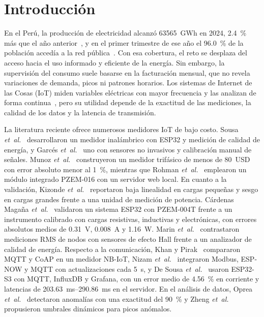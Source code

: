 \section{Introducción}
\label{sec:introduction}

En el Perú, la producción de electricidad alcanzó \SI{63565}{GWh} en 2024, \SI{2,4}{\percent} más que el año anterior~\cite{minem2025produccion}, y en el primer trimestre de ese año el \SI{96,0}{\percent} de la población accedía a la red pública~\cite{inei2024acceso}.
Con esa cobertura, el reto se desplaza del acceso hacia el uso informado y eficiente de la energía.
Sin embargo, la supervisión del consumo suele basarse en la facturación mensual, que no revela variaciones de demanda, picos ni patrones horarios.
Los sistemas de Internet de las Cosas (IoT) miden variables eléctricas con mayor frecuencia y las analizan de forma continua~\cite{rind2023perspective}, pero su utilidad depende de la exactitud de las mediciones, la calidad de los datos y la latencia de transmisión.

La literatura reciente ofrece numerosos medidores IoT de bajo costo.
Sousa \textit{et~al.}~\cite{sousa2023smartmeter} desarrollaron un medidor inalámbrico con ESP32 y medición de calidad de energía, y Garcés \textit{et~al.}~\cite{garces2025iotmeter} uno con sensores no invasivos y calibración manual de señales.
Munoz \textit{et~al.}~\cite{munoz2024smartmeter} construyeron un medidor trifásico de menos de \SI{80}{USD} con error absoluto menor al \SI{1}{\percent}, mientras que Rohman \textit{et~al.}~\cite{rohman2025esp32} emplearon un módulo integrado PZEM-016 con un servidor web local.
En cuanto a la validación, Kizonde \textit{et~al.}~\cite{kizonde2023monitoringnode} reportaron baja linealidad en cargas pequeñas y sesgo en cargas grandes frente a una unidad de medición de potencia.
Cárdenas Magaña \textit{et~al.}~\cite{cardenas2026residential} validaron un sistema ESP32 con PZEM-004T frente a un instrumento calibrado con cargas resistivas, inductivas y electrónicas, con errores absolutos medios de \SI{0,31}{V}, \SI{0,008}{A} y \SI{1,16}{W}.
Marin \textit{et~al.}~\cite{marin2026rmsbenchmark} contrastaron mediciones RMS de nodos con sensores de efecto Hall frente a un analizador de calidad de energía.
Respecto a la comunicación, Khan y Pirak~\cite{khan2021mqtt} compararon MQTT y CoAP en un medidor NB-IoT, Nizam \textit{et~al.}~\cite{nizam2024realtime} integraron Modbus, ESP-NOW y MQTT con actualizaciones cada \SI{5}{s}, y De Sousa \textit{et~al.}~\cite{desousa2026smartmeter} usaron ESP32-S3 con MQTT, InfluxDB y Grafana, con un error medio de \SI{4,56}{\percent} en corriente y latencias de \SIrange{203,63}{290,86}{ms} en el servidor.
En el análisis de datos, Oprea \textit{et~al.}~\cite{oprea2021anomaly} detectaron anomalías con una exactitud del \SI{90}{\percent} y Zheng \textit{et~al.}~\cite{zheng2023thresholds} propusieron umbrales dinámicos para picos anómalos.

